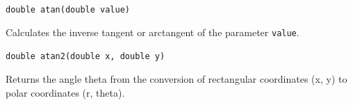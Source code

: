 \documentclass[a4paper, 10pt]{report}
\begin{document}
\hrulefill

{\large {\tt double atan(double value)}}

Calculates the inverse tangent or arctangent of the parameter {\tt value}. 

\hrulefill

{\large {\tt double atan2(double x, double y)}}

Returns the angle theta from the conversion of rectangular coordinates (x, y) to polar coordinates (r, theta).

\end{document}
